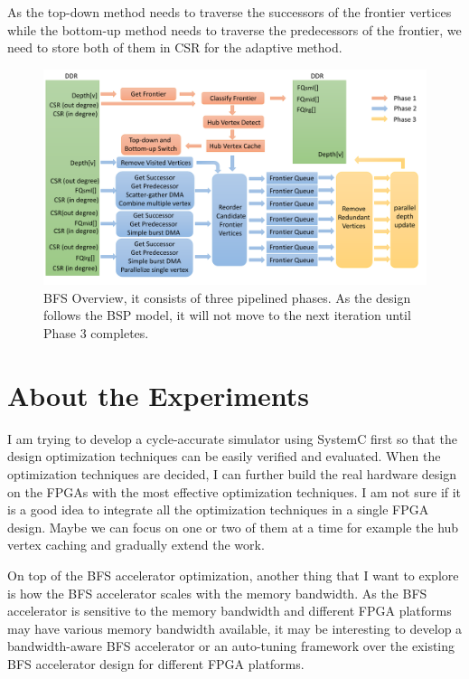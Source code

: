 \documentclass[12pt]{article} %
\begin{document}
As the top-down method needs to traverse the successors of the frontier vertices while the 
bottom-up method needs to traverse the predecessors of the frontier, we need to store both of them 
in CSR for the adaptive method. 

\begin{figure}[tb]
\centering
\includegraphics[width=0.9\linewidth]{bfs-overview}
\caption{BFS Overview, it consists of three pipelined phases. As the design follows the BSP model, 
    it will not move to the next iteration until Phase 3 completes. }
\label{fig:bfs-overview}
\vspace{-1em}
\end{figure}


\section{About the Experiments}
I am trying to develop a cycle-accurate simulator using SystemC first so that the design 
optimization techniques can be easily verified and evaluated. When the optimization techniques 
are decided, I can further build the real hardware design on the FPGAs with the most effective 
optimization techniques. I am not sure if it is a good idea to integrate all the optimization 
techniques in a single FPGA design. Maybe we can focus on one or two of them at a time for example the 
hub vertex caching and gradually extend the work. 

On top of the BFS accelerator optimization, another 
thing that I want to explore is how the BFS accelerator scales with the memory bandwidth. As the 
BFS accelerator is sensitive to the memory bandwidth and different FPGA platforms may have various 
memory bandwidth available, it may be interesting to develop a bandwidth-aware BFS accelerator or 
an auto-tuning framework over the existing BFS accelerator design for different FPGA platforms.  
\end{document}
